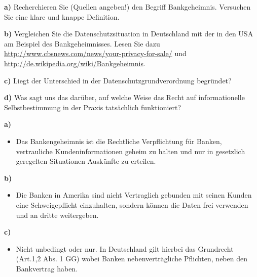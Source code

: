 \documentclass[a4paper]{assignment}
\begin{document}
\begin{problemlist}
\begin{problem}
			\textbf{a)} Recherchieren Sie (Quellen angeben!) den Begriff Bankgeheimnis. Versuchen Sie eine klare und knappe Definition.
			
			\textbf{b)} Vergleichen Sie die Datenschutzsituation in Deutschland mit der in den USA am Beispiel des Bankgeheimnisses. Lesen Sie dazu \url{http://www.cbsnews.com/news/your-privacy-for-sale/} und \url{http://de.wikipedia.org/wiki/Bankgeheimnis}.
			
			\textbf{c)} Liegt der Unterschied in der Datenschutzgrundverordnung begründet?
			
			\textbf{d)} Was sagt uns das darüber, auf welche Weise das Recht auf informationelle Selbstbestimmung in der Praxis tatsächlich funktioniert?			
			
			\begin{answer}
			
				\textbf{a)}
				\begin{itemize}
					\item Das Bankengeheimnis ist die Rechtliche Verpflichtung für Banken, vertrauliche Kundeninformationen geheim zu halten und nur in gesetzlich geregelten Situationen Auskünfte zu erteilen.\cite{FIV-Banken}
				\end{itemize}
				
				\textbf{b)}
				\begin{itemize}
					\item Die Banken in Amerika sind nicht Vertraglich gebunden mit seinen Kunden eine Schweigepflicht einzuhalten, sondern können die Daten frei verwenden und an dritte weitergeben.
				\end{itemize}
				
				\textbf{c)}
				\begin{itemize}
					\item Nicht unbedingt oder nur. In Deutschland gilt hierbei das Grundrecht (Art.1,2 Abs. 1 GG) wobei Banken nebenverträgliche Pflichten, neben den Bankvertrag haben.\cite{FIV-Banken}
					
				\end{itemize}


\end{answer}
\end{problem}
\end{problemlist}
\end{document}
